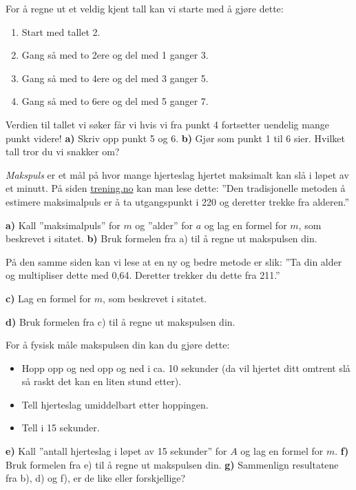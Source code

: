 



\opgt

 For å regne ut et veldig kjent tall kan vi starte med å gjøre dette: \os
\begin{enumerate}
	\item Start med tallet 2.
	\item Gang så med to 2ere og del med 1 ganger 3.
	\item Gang så med to 4ere og del med 3 ganger 5.
	\item Gang så med to 6ere og del med 5 ganger 7.
\end{enumerate}
Verdien til tallet vi søker får vi hvis vi fra punkt 4 fortsetter uendelig mange punkt videre!\os
\textbf{a)} Skriv opp punkt 5 og 6. \os
\textbf{b)} Gjør som punkt 1 til 6 sier. Hvilket tall tror du vi snakker om?

\textit{Makspuls} er et mål på hvor mange hjerteslag hjertet maksimalt kan slå i løpet av et minutt. På siden \href{http://www.trening.no/utholdenhet/ny-formel-for-beregning-av-makspuls/}{\color{blue}trening.no} kan man lese dette:\os
''Den tradisjonelle metoden å estimere maksimalpuls er å ta utgangspunkt i 220 og deretter trekke fra alderen.''\os

\textbf{a)} Kall ''maksimalpuls'' for $ m $ og ''alder'' for $ a $ og lag en formel for $ m $, som beskrevet i sitatet. \os
\textbf{b)} Bruk formelen fra a) til å regne ut makspulsen din.\vsk

På den samme siden kan vi lese at en ny og bedre metode er slik:\os
''Ta din alder og multipliser dette med 0,64. Deretter trekker du dette fra 211.''\os

\textbf{c)} Lag en formel for $ m $, som beskrevet i sitatet.\os

\textbf{d)} Bruk formelen fra c) til å regne ut makspulsen din.

\vsk
For å fysisk måle makspulsen din kan du gjøre dette:
\begin{itemize}
	\item Hopp opp og ned opp og ned i ca. 10 sekunder (da vil hjertet ditt omtrent slå så raskt det kan en liten stund etter).
	\item Tell hjerteslag umiddelbart etter hoppingen.
	\item Tell i 15 sekunder.
\end{itemize}
\textbf{e)} Kall ''antall hjerteslag i løpet av 15 sekunder'' for $ A $ og lag en formel for $ m $.\os
\textbf{f)} Bruk formelen fra e) til å regne ut makspulsen din.\os
\textbf{g)} Sammenlign resultatene fra b), d) og f), er de like eller forskjellige?

